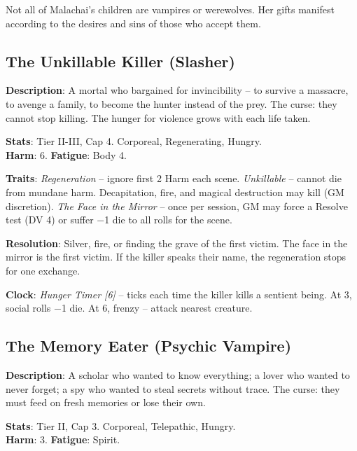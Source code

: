 \noindent Not all of Malachai's children are vampires or werewolves. Her gifts manifest according to the desires and sins of those who accept them.

\subsection*{The Unkillable Killer (Slasher)}

\noindent\textbf{Description}: A mortal who bargained for invincibility -- to survive a massacre, to avenge a family, to become the hunter instead of the prey. The curse: they cannot stop killing. The hunger for violence grows with each life taken.

\noindent\textbf{Stats}: Tier II-III, Cap 4. Corporeal, Regenerating, Hungry.\\
\textbf{Harm}: 6. \textbf{Fatigue}: Body 4.

\noindent\textbf{Traits}: 
\emph{Regeneration} -- ignore first 2 Harm each scene. \emph{Unkillable} -- cannot die from mundane harm. Decapitation, fire, and magical destruction may kill (GM discretion). \emph{The Face in the Mirror} -- once per session, GM may force a Resolve test (DV 4) or suffer −1 die to all rolls for the scene.

\noindent\textbf{Resolution}: Silver, fire, or finding the grave of the first victim. The face in the mirror is the first victim. If the killer speaks their name, the regeneration stops for one exchange.

\noindent\textbf{Clock}: \emph{Hunger Timer [6]} -- ticks each time the killer kills a sentient being. At 3, social rolls −1 die. At 6, frenzy -- attack nearest creature.


\subsection*{The Memory Eater (Psychic Vampire)}

\noindent\textbf{Description}: A scholar who wanted to know everything; a lover who wanted to never forget; a spy who wanted to steal secrets without trace. The curse: they must feed on fresh memories or lose their own.

\noindent\textbf{Stats}: Tier II, Cap 3. Corporeal, Telepathic, Hungry.\\
\textbf{Harm}: 3. \textbf{Fatigue}: Spirit.

